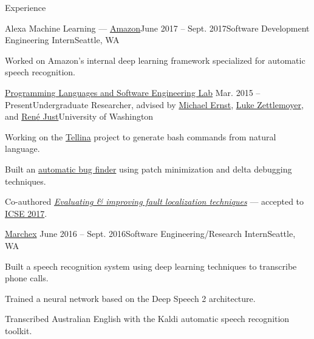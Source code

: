 \documentclass{resume} %
\begin{document}

\begin{rSection}{Experience}

  \begin{rSubsection}{Alexa Machine Learning --- {\href{https://www.amazon.com/}{Amazon}}}{June 2017 -- Sept. 2017}{Software Development Engineering Intern}{Seattle, WA}
    \item Worked on Amazon's internal deep learning framework specialized for automatic
    speech recognition.
  \end{rSubsection}

  \begin{rSubsection}{\href{https://uwplse.org/}{Programming Languages and Software Engineering Lab}}
    {Mar. 2015 -- Present}{Undergraduate Researcher, advised by \href{https://homes.cs.washington.edu/~mernst/}{Michael Ernst}, \href{https://www.cs.washington.edu/people/faculty/lsz}{Luke Zettlemoyer}, and \href{https://people.cs.umass.edu/~rjust/}{Ren{\'e} Just}}{University of Washington}
  \item Working on the \href{https://github.com/TellinaTool}{Tellina} project to generate bash commands from natural language.
  \item Built an \href{https://github.com/dericp/patch-minimization}{automatic bug finder} using patch minimization and delta debugging techniques.
  \item Co-authored \href{https://homes.cs.washington.edu/~dericp/resources/fault-localization-tr160803.pdf}{\emph{Evaluating \& improving fault localization techniques}} --- accepted to \href{http://icse2017.gatech.edu/}{ICSE 2017}.
  \end{rSubsection}
  
  \begin{rSubsection}{\href{http://www.marchex.com/}{Marchex}}
    {June 2016 -- Sept. 2016}{Software Engineering/Research Intern}{Seattle, WA}
  \item Built a speech recognition system using deep learning techniques to transcribe phone calls.
  \item Trained a neural network based on the Deep Speech 2 architecture.
  \item Transcribed Australian English with the Kaldi automatic speech recognition toolkit.
  \end{rSubsection}


\end{rSection}
\end{document}
